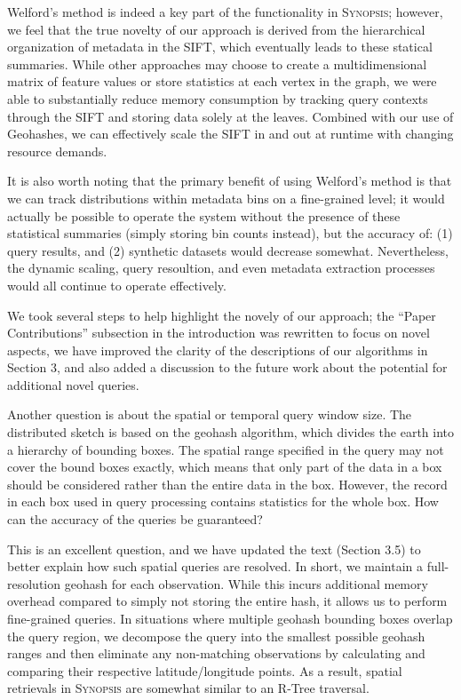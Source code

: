 \documentclass{article}
\begin{document}
\begin{tcolorbox}
    Welford's method is indeed a key part of the functionality in \textsc{Synopsis}; however, we feel that the true novelty of our approach is derived from the hierarchical organization of metadata in the SIFT, which eventually leads to these statical summaries. While other approaches may choose to create a multidimensional matrix of feature values or store statistics at each vertex in the graph, we were able to substantially reduce memory consumption by tracking query contexts through the SIFT and storing data solely at the leaves. Combined with our use of Geohashes, we can effectively scale the SIFT in and out at runtime with changing resource demands.

It is also worth noting that the primary benefit of using Welford's method is that we can track distributions within metadata bins on a fine-grained level; it would actually be possible to operate the system without the presence of these statistical summaries (simply storing bin counts instead), but the accuracy of: (1) query results, and (2) synthetic datasets would decrease somewhat. Nevertheless, the dynamic scaling, query resoultion, and even metadata extraction processes would all continue to operate effectively.

We took several steps to help highlight the novely of our approach; the ``Paper Contributions'' subsection in the introduction was rewritten to focus on novel aspects, we have improved the clarity of the descriptions of our algorithms in Section 3, and also added a discussion to the future work about the potential for additional novel queries.
\end{tcolorbox}

Another question is about the spatial or temporal query window size. The
distributed sketch is based on the geohash algorithm, which divides the
earth into a hierarchy of bounding boxes. The spatial range specified in
the query may not cover the bound boxes exactly, which means that only
part of the data in a box should be considered rather than the entire
data in the box. However, the record in each box used in query
processing contains statistics for the whole box. How can the accuracy
of the queries be guaranteed?

\begin{tcolorbox}
    This is an excellent question, and we have updated the text (Section 3.5) to better explain how such spatial queries are resolved. In short, we maintain a full-resolution geohash for each observation. While this incurs additional memory overhead compared to simply not storing the entire hash, it allows us to perform fine-grained queries. In situations where multiple geohash bounding boxes overlap the query region, we decompose the query into the smallest possible geohash ranges and then eliminate any non-matching observations by calculating and comparing their respective latitude/longitude points. As a result, spatial retrievals in \textsc{Synopsis} are somewhat similar to an R-Tree \cite{guttman1984r} traversal.
\end{tcolorbox}
\end{document}
